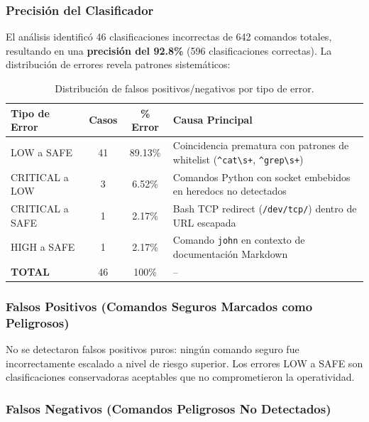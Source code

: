 \subsubsection{Precisión del Clasificador}

El análisis identificó 46 clasificaciones incorrectas de 642 comandos totales, resultando en una \textbf{precisión del 92.8\%} (596 clasificaciones correctas). La distribución de errores revela patrones sistemáticos:

\begin{table}[H]
\centering
\renewcommand{\arraystretch}{1.2}
\begin{tabular}{|l|c|c|p{6cm}|}
\hline
\rowcolor[gray]{0.85}
\textbf{Tipo de Error} & \textbf{Casos} & \textbf{\% Error} & \textbf{Causa Principal} \\
\hline
LOW a SAFE & 41 & 89.13\% & Coincidencia prematura con patrones de whitelist (\texttt{\^{}cat\textbackslash s+}, \texttt{\^{}grep\textbackslash s+}) \\
\hline
CRITICAL a LOW & 3 & 6.52\% & Comandos Python con socket embebidos en heredocs no detectados \\
\hline
CRITICAL a SAFE & 1 & 2.17\% & Bash TCP redirect (\texttt{/dev/tcp/}) dentro de URL escapada \\
\hline
HIGH a SAFE & 1 & 2.17\% & Comando \texttt{john} en contexto de documentación Markdown \\
\hline
\rowcolor[gray]{0.95}
\textbf{TOTAL} & 46 & 100\% & -- \\
\hline
\end{tabular}
\caption{Distribución de falsos positivos/negativos por tipo de error.}
\label{tab:falsos_positivos_tipos}
\end{table}

\subsubsection{Falsos Positivos (Comandos Seguros Marcados como Peligrosos)}

No se detectaron falsos positivos puros: ningún comando seguro fue incorrectamente escalado a nivel de riesgo superior. Los errores LOW a SAFE son clasificaciones conservadoras aceptables que no comprometieron la operatividad.

\subsubsection{Falsos Negativos (Comandos Peligrosos No Detectados)}

